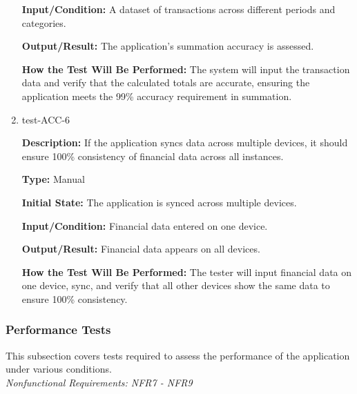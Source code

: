 \documentclass[12pt, titlepage]{article}
\begin{document}
\begin{enumerate}
\textbf{Input/Condition:} A dataset of transactions across different periods and categories.
					
\textbf{Output/Result:} The application’s summation accuracy is assessed.
					
\textbf{How the Test Will Be Performed:} The system will input the transaction data and verify that the calculated totals are accurate, ensuring the application meets the 99\% accuracy requirement in summation.

\item{test-ACC-6\\}

\textbf{Description:} If the application syncs data across multiple devices, it should ensure 100\% consistency of financial data across all instances.

\textbf{Type:} Manual
					
\textbf{Initial State:} The application is synced across multiple devices.
					
\textbf{Input/Condition:} Financial data entered on one device.
					
\textbf{Output/Result:} Financial data appears on all devices.
					
\textbf{How the Test Will Be Performed:} The tester will input financial data on one device, sync, and verify that all other devices show the same data to ensure 100\% consistency.

\end{enumerate}

\subsubsection{Performance Tests}

This subsection covers tests required to assess the performance of the application under various conditions.\\
\textit{Nonfunctional Requirements: NFR7 - NFR9}
\end{document}
